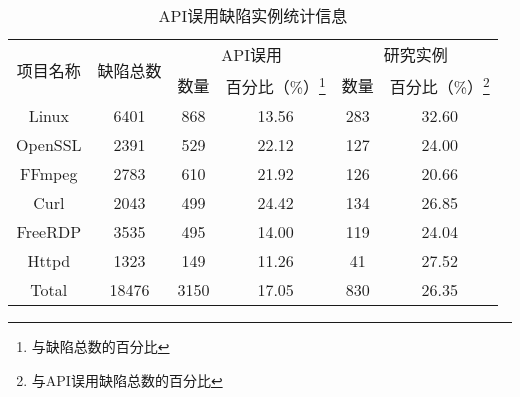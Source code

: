 \begin{table}[b]
	\centering
	\begin{minipage}[t]{0.85\linewidth} %
		\caption{API误用缺陷实例统计信息}
		\label{tab:2-3-studied}
		\begin{tabular}{cccccc}
			\hline
			\multirow{2}{*}{项目名称} & \multirow{2}{*}{缺陷总数} & \multicolumn{2}{c}{API误用}& \multicolumn{2}{c}{研究实例}\\
			\cline{3-4}\cline{5-6}
			&  & 数量 & 百分比（\%）\footnote{与缺陷总数的百分比} & 数量& 百分比（\%）\footnote{与API误用缺陷总数的百分比} \\
			\hline
			Linux & 6401 & 868 & 13.56 & 283 & 32.60 \\
			OpenSSL & 2391 & 529 & 22.12 &127  & 24.00 \\
			FFmpeg & 2783 & 610 & 21.92 & 126 & 20.66 \\
			Curl & 2043 & 499 & 24.42 & 134 & 26.85 \\
			FreeRDP & 3535 & 495 & 14.00 & 119 & 24.04 \\
			Httpd & 1323 & 149 & 11.26 & 41 & 27.52 \\
			\hline
			Total & 18476 & 3150 & 17.05 & 830 & 26.35 \\
			\hline
		\end{tabular}
	\end{minipage}
\end{table}
